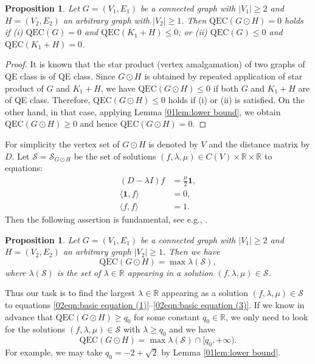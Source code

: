 \documentclass[12pt,a4paper]{article}
\newtheorem{proposition}[theorem]{Proposition}
\newcommand{\1}{{\bm 1}}
\numberwithin{equation}{section}
\begin{document}
\begin{proposition}\label{01prop:QEC=0}
Let $G=(V_1,E_1)$ be a connected graph with $|V_1|\ge2$
and $H=(V_2,E_2)$ an arbitrary graph with $|V_2|\ge1$.
Then $\mathrm{QEC}(G\odot H)=0$ holds if
{\upshape (i)} $\mathrm{QEC}(G)=0$ and $\mathrm{QEC}(K_1+H)\le0$;
or {\upshape (ii)} $\mathrm{QEC}(G)\le0$ and $\mathrm{QEC}(K_1+H)=0$.
\end{proposition}

\begin{proof}
It is known \cite{Mlotkowski-Obata2020,Obata-Zakiyyah2018} that
the star product (vertex amalgamation) of two graphs of QE class
is of QE class.
Since $G\odot H$ is obtained by repeated application of
star product of $G$ and $K_1+H$,
we have $\mathrm{QEC}(G\odot H)\le 0$
if both $G$ and $K_1+H$ are of QE class.
Therefore, $\mathrm{QEC}(G\odot H)\le 0$ holds
if (i) or (ii) is satisfied.
On the other hand, in that case, applying
Lemma \ref{01lem:lower bound}, we obtain
$\mathrm{QEC}(G\odot H)\ge 0$
and hence $\mathrm{QEC}(G\odot H)=0$.
\end{proof}

For simplicity the vertex set of $G\odot H$ is denoted by $V$
and the distance matrix by $D$.
Let $\mathcal{S}=\mathcal{S}_{G\odot H}$ be the set of solutions 
$(f,\lambda,\mu)\in C(V)\times \mathbb{R}\times \mathbb{R}$
to equations:
%
\begin{align}
(D-\lambda I)f &=\frac{\mu}{2}\bm{1}, 
\label{02eqn:basic equation (1)} \\
\langle \bm{1},f\rangle &=0, 
\label{02eqn:basic equation (2)} \\
\langle f,f\rangle &=1.
\label{02eqn:basic equation (3)}
\end{align}
%
Then the following assertion is fundamental, see
e.g., \cite{Obata-Zakiyyah2018}.

\begin{proposition}\label{02prop:starting expression for QEC}
Let $G=(V_1,E_1)$ be a connected graph with $|V_1|\ge2$
and $H=(V_2,E_2)$ an arbitrary graph $|V_2|\ge1$.
Then we have
%
\begin{equation}\label{03eqn:starting formula for QEC(1)}
\mathrm{QEC}(G\odot H)
=\max \lambda(\mathcal{S}),
\end{equation}
%
where $\lambda(\mathcal{S})$ is the set of $\lambda\in\mathbb{R}$
appearing in a solution $(f,\lambda,\mu)\in\mathcal{S}$.
\end{proposition}

Thus our task is to find the largest $\lambda\in\mathbb{R}$
appearing as a solution $(f,\lambda,\mu)\in\mathcal{S}$ to equations 
\eqref{02eqn:basic equation (1)}--\eqref{02eqn:basic equation (3)}.
If we know in advance that $\mathrm{QEC}(G\odot H)\ge q_0$
for some constant $q_0\in\mathbb{R}$, we only need to look for
the solutions $(f,\lambda,\mu)\in\mathcal{S}$ with $\lambda\ge q_0$
and we have
%
\begin{equation}\label{02eqn:QEC by lower bound q_0}
\mathrm{QEC}(G\odot H)
=\max \lambda(\mathcal{S})\cap[q_0,+\infty).
\end{equation}
%
For example, we may take $q_0=-2+\sqrt2$ by 
Lemma \ref{01lem:lower bound}.
\end{document}
